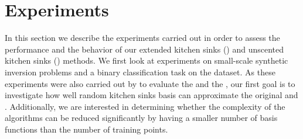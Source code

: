 \section{Experiments}
%
In this section we describe the experiments carried out in order to assess 
the performance and the behavior of our extended kitchen sinks (\eks) and 
unscented kitchen sinks (\uks) methods. We first look at experiments on 
small-scale synthetic inversion problems and a binary classification task on 
the \usps dataset. As these experiments were also carried out by 
\citet{steinberg-bonilla-nips-2014} to evaluate the \egp and the \ugp, 
our first goal  is to investigate how well 
random kitchen sinks basis can approximate the original \egp and \ugp.
Additionally, we are interested in determining whether the complexity 
of the algorithms  can be reduced significantly by having a smaller number 
of basis functions than the number of training points.
%
